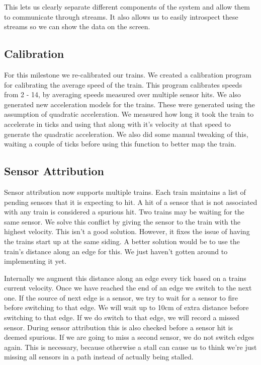 \documentclass{article}
\begin{document}
This lets us clearly separate different components of the system and allow them to communicate through streams. It also allows us to easily introspect these streams so we can show the data on the screen.

\subsection{Calibration}

For this milestone we re-calibrated our trains. We created a calibration program for calibrating the average speed of the train. This program calibrates speeds from 2 - 14, by averaging speeds measured over multiple sensor hits. We also generated new acceleration models for the trains. These were generated using the assumption of quadratic acceleration. We measured how long it took the train to accelerate in ticks and using that along with it's velocity at that speed to generate the quadratic acceleration. We also did some manual tweaking of this, waiting a couple of ticks before using this function to better map the train.

\subsection{Sensor Attribution}

Sensor attribution now supports multiple trains. Each train maintains a list of pending sensors that it is expecting to hit. A hit of a sensor that is not associated with any train is considered a spurious hit. Two trains may be waiting for the same sensor. We solve this conflict by giving the sensor to the train with the highest velocity. This isn't a good solution. However, it fixes the issue of having the trains start up at the same siding. A better solution would be to use the train's distance along an edge for this. We just haven't gotten around to implementing it yet.

Internally we augment this distance along an edge every tick based on a trains current velocity. Once we have reached the end of an edge we switch to the next one. If the source of next edge is a sensor, we try to wait for a sensor to fire before switching to that edge. We will wait up to 10cm of extra distance before switching to that edge. If we do switch to that edge, we will record a missed sensor. During sensor attribution this is also checked before a sensor hit is deemed spurious. If we are going to miss a second sensor, we do not switch edges again. This is necessary, because otherwise a stall can cause us to think we're just missing all sensors in a path instead of actually being stalled.
\end{document}
